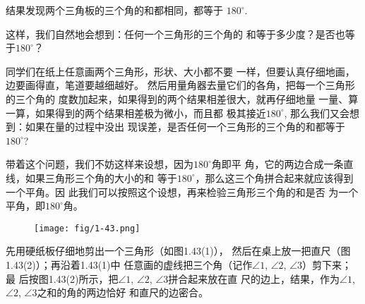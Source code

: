 结果发现两个三角板的三个角的和都相同，都等于
$180^{\circ}$.

\begin{figure}[htp]
	\centering
{}
	\caption{}
\end{figure}


这样，我们自然地会想到：任何一个三角形的三个角的
和等于多少度？是否也等于$180^{\circ}$？

同学们在纸上任意画两个三角形，形状、大小都不要
一样，但要认真仔细地画，边要画得直，笔道要越细越好。
然后用量角器去量它们的各角，把每一个三角形的三个角的
度数加起来，如果得到的两个结果相差很大，就再仔细地量
一量、算一算，如果得到的两个结果相差极为微小，而且都
极其接近$180^{\circ}$, 那么我们又会想到：如果在量的过程中没出
现误差，是否任何一个三角形的三个角的和都等于$180^{\circ}$?

带着这个问题，我们不妨这样来设想，因为$180^{\circ}$角即平
角，它的两边合成一条直线，如果三角形三个角的大小的和
等于$180^{\circ}$，那么这三个角拼合起来就应该得到一个平角。因
此我们可以按照这个设想，再来检验三角形三个角的和是否
为一个平角，即$180^{\circ}$角。

\begin{figure}[htp]
	\centering
\texttt{[image: fig/1-43.png]}
	\caption{}
\end{figure}

先用硬纸板仔细地剪出一个三角形（如图1.43(1)），
然后在桌上放一把直尺（图1.43(2)）；再沿着1.43(1)中
任意画的虚线把三个角（记作$\angle 1$, $\angle 2$, $\angle 3$）剪下来；最
后按图1.43(2)所示，把$\angle 1$, $\angle 2$, $\angle 3$拼合起来放在直
尺的边上，结果，作为$\angle 1$, $\angle 2$, $\angle 3$之和的角的两边恰好
和直尺的边密合。


